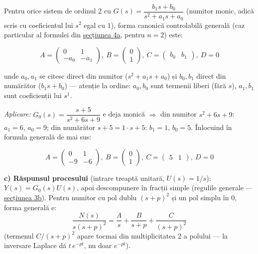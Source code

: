 \documentclass[10pt,a4paper]{article}
\newcommand{\tip}[1]{\textcolor{blue!55!black}{#1}}
\begin{document}
Pentru orice sistem de ordinul 2 cu $G(s)=\dfrac{b_1s+b_0}{s^2+a_1s+a_0}$ (numitor monic, adică scris cu coeficientul lui $s^2$ egal cu $1$), forma canonică controlabilă generală (caz particular al formulei din \hyperref[sec:4]{secțiunea 4a}, pentru $n{=}2$) este:
\begin{keyeq}\color{red!65!black}
$$A=\begin{pmatrix}0&1\\-a_0&-a_1\end{pmatrix},\ B=\begin{pmatrix}0\\1\end{pmatrix},\ C=\begin{pmatrix}b_0&b_1\end{pmatrix},\ D=0$$
\end{keyeq}
unde $a_0,a_1$ se citesc direct din numitor ($s^2+a_1s+a_0$) și $b_0,b_1$ direct din numărător ($b_1s+b_0$) — \tip{atenție la ordine: $a_0,b_0$ sunt termenii liberi (fără $s$), $a_1,b_1$ sunt coeficienții lui $s^1$.}

\textit{Aplicare:} $G_0(s)=\dfrac{s+5}{s^2+6s+9}$ e deja monică $\Rightarrow$ din numitor $s^2{+}6s{+}9$: $a_1{=}6,\,a_0{=}9$; din numărător $s{+}5{=}1{\cdot}s+5$: $b_1{=}1,\,b_0{=}5$. Înlocuind în formula generală de mai sus:
\begin{keyeq}\color{red!65!black}
$$A=\begin{pmatrix}0&1\\-9&-6\end{pmatrix},\ B=\begin{pmatrix}0\\1\end{pmatrix},\ C=\begin{pmatrix}5&1\end{pmatrix},\ D=0$$
\end{keyeq}

\textbf{c) Răspunsul procesului} (intrare treaptă unitară, $U(s){=}1/s$): $Y(s)=G_0(s)U(s)$, apoi descompunere în fracții simple (regulile generale — \hyperref[sec:3b]{secțiunea 3b}). Pentru numitor cu pol dublu $(s+p)^2$ și un pol simplu în $0$, forma generală e:
$$\dfrac{N(s)}{s(s+p)^2}=\dfrac{A}{s}+\dfrac{B}{s+p}+\dfrac{C}{(s+p)^2}$$
(termenul $C/(s+p)^2$ apare tocmai din multiplicitatea 2 a polului — la inversare Laplace dă $t\,e^{-pt}$, nu doar $e^{-pt}$).
\end{document}
